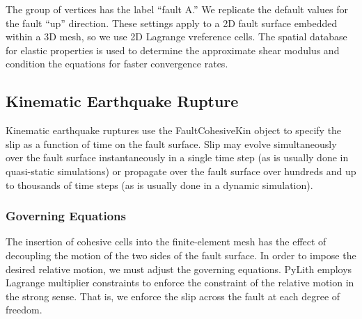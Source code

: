 The group of vertices has the label ``fault A.'' We replicate the
default values for the fault ``up'' direction. These settings apply
to a 2D fault surface embedded within a 3D mesh, so we use 2D Lagrange
vreference cells. The spatial database for elastic properties is used
to determine the approximate shear modulus and condition the equations
for faster convergence rates.


\subsection{Kinematic Earthquake Rupture}

Kinematic earthquake ruptures use the FaultCohesiveKin object to specify
the slip as a function of time on the fault surface. Slip may evolve
simultaneously over the fault surface instantaneously in a single
time step (as is usually done in quasi-static simulations) or propagate
over the fault surface over hundreds and up to thousands of time steps
(as is usually done in a dynamic simulation).


\subsubsection{Governing Equations}

The insertion of cohesive cells into the finite-element mesh has the
effect of decoupling the motion of the two sides of the fault surface.
In order to impose the desired relative motion, we must adjust the
governing equations. PyLith employs Lagrange multiplier constraints
to enforce the constraint of the relative motion in the strong sense.
That is, we enforce the slip across the fault at each degree of freedom.

